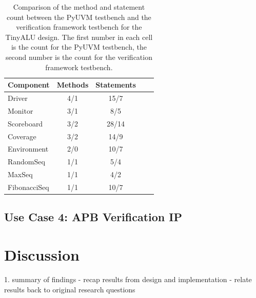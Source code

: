 \begin{table}
\centering
\begin{tabular}{|l|c|c|c|c|}
\hline
\textbf{Component}       & \textbf{Methods} & \textbf{Statements} \\ \hline
Driver          & 4/1             & 15/7 \\ \hline
Monitor         & 3/1             & 8/5    \\ \hline
Scoreboard       & 3/2            & 28/14    \\ \hline
Coverage      & 3/2             & 14/9      \\ \hline
Environment        & 2/0             & 10/7    \\ \hline
RandomSeq   & 1/1 & 5/4 \\ \hline
MaxSeq   & 1/1 & 4/2 \\ \hline
FibonacciSeq   & 1/1 & 10/7 \\ \hline
\end{tabular}
\caption{Comparison of the method and statement count between the PyUVM testbench and the verification framework testbench for the TinyALU design. The first number in each cell is the count for the PyUVM testbench, the second number is the count for the verification framework testbench.}
\label{tab:comparison}
\end{table}




\section{Use Case 4: APB Verification IP} %


\cite{didactic}

\chapter{Discussion} %


1. summary of findings
  - recap results from design and implementation
  - relate results back to original research questions

